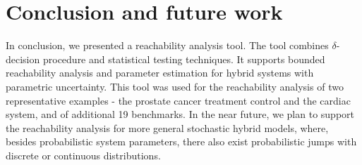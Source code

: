 \section{Conclusion and future work}
In conclusion, we presented a reachability analysis tool. The tool combines $\delta$-decision procedure \cite{gao2013dreal, gao2012dreal, gaodelta} and statistical testing techniques. It supports bounded reachability analysis and parameter estimation for hybrid systems with parametric uncertainty. This tool was used for the reachability analysis of two representative examples - the prostate cancer treatment control and the cardiac system, and of additional 19 benchmarks. In the near future, we plan to support the reachability analysis for more general stochastic hybrid models, where, besides probabilistic system parameters, there also exist probabilistic jumps with discrete or continuous distributions. 
